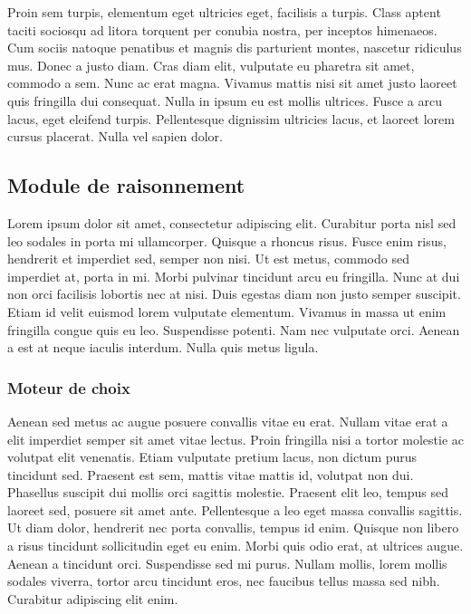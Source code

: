 Proin sem turpis, elementum eget ultricies eget, facilisis a turpis. Class aptent taciti sociosqu ad litora torquent per conubia nostra, per inceptos himenaeos. Cum sociis natoque penatibus et magnis dis parturient montes, nascetur ridiculus mus. Donec a justo diam. Cras diam elit, vulputate eu pharetra sit amet, commodo a sem. Nunc ac erat magna. Vivamus mattis nisi sit amet justo laoreet quis fringilla dui consequat. Nulla in ipsum eu est mollis ultrices. Fusce a arcu lacus, eget eleifend turpis. Pellentesque dignissim ultricies lacus, et laoreet lorem cursus placerat. Nulla vel sapien dolor. 

\subsection{Module de raisonnement}

Lorem ipsum dolor sit amet, consectetur adipiscing elit. Curabitur porta nisl sed leo sodales in porta mi ullamcorper. Quisque a rhoncus risus. Fusce enim risus, hendrerit et imperdiet sed, semper non nisi. Ut est metus, commodo sed imperdiet at, porta in mi. Morbi pulvinar tincidunt arcu eu fringilla. Nunc at dui non orci facilisis lobortis nec at nisi. Duis egestas diam non justo semper suscipit. Etiam id velit euismod lorem vulputate elementum. Vivamus in massa ut enim fringilla congue quis eu leo. Suspendisse potenti. Nam nec vulputate orci. Aenean a est at neque iaculis interdum. Nulla quis metus ligula. 

\subsubsection{Moteur de choix}

Aenean sed metus ac augue posuere convallis vitae eu erat. Nullam vitae erat a elit imperdiet semper sit amet vitae lectus. Proin fringilla nisi a tortor molestie ac volutpat elit venenatis. Etiam vulputate pretium lacus, non dictum purus tincidunt sed. Praesent est sem, mattis vitae mattis id, volutpat non dui. Phasellus suscipit dui mollis orci sagittis molestie. Praesent elit leo, tempus sed laoreet sed, posuere sit amet ante. Pellentesque a leo eget massa convallis sagittis. Ut diam dolor, hendrerit nec porta convallis, tempus id enim. Quisque non libero a risus tincidunt sollicitudin eget eu enim. Morbi quis odio erat, at ultrices augue. Aenean a tincidunt orci. Suspendisse sed mi purus. Nullam mollis, lorem mollis sodales viverra, tortor arcu tincidunt eros, nec faucibus tellus massa sed nibh. Curabitur adipiscing elit enim. 

